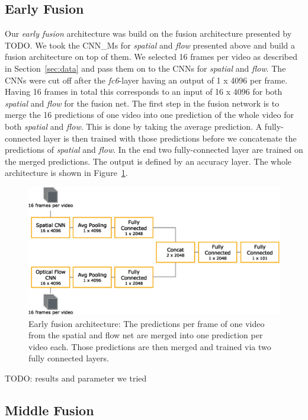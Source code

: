 \subsection{Early Fusion}
Our \emph{early fusion} architecture was build on the fusion architecture presented by TODO.
We took the CNN\_Ms for \emph{spatial} and \emph{flow} presented above and build a fusion architecture on top of them.
We selected 16 frames per video as described in Section~\ref{sec:data} and pass them on to the CNNs for \emph{spatial} and \emph{flow}.
The CNNs were cut off after the \textit{fc6}-layer having an output of 1 x 4096 per frame.
Having 16 frames in total this corresponds to an input of 16 x 4096 for both \emph{spatial} and \emph{flow} for the fusion net.
The first step in the fusion network is to merge the 16 predictions of one video into one prediction of the whole video for both \emph{spatial} and \emph{flow}.
This is done by taking the average prediction.
A fully-connected layer is then trained with those predictions before we concatenate the predictions of \emph{spatial} and \emph{flow}.
In the end two fully-connected layer are trained on the merged predictions.
The output is defined by an accuracy layer.
The whole architecture is shown in Figure~\ref{fig:early_fusion}.
\begin{figure}[!htb]
	\centering
	\includegraphics[scale=.7]{images/early_fusion.eps}
	\caption{Early fusion architecture: The predictions per frame of one video from the spatial and flow net are merged into one prediction per video each. Those predictions are then merged and trained via two fully connected layers.}
	\label{fig:early_fusion}
\end{figure}

TODO: results and parameter we tried

\subsection{Middle Fusion}


